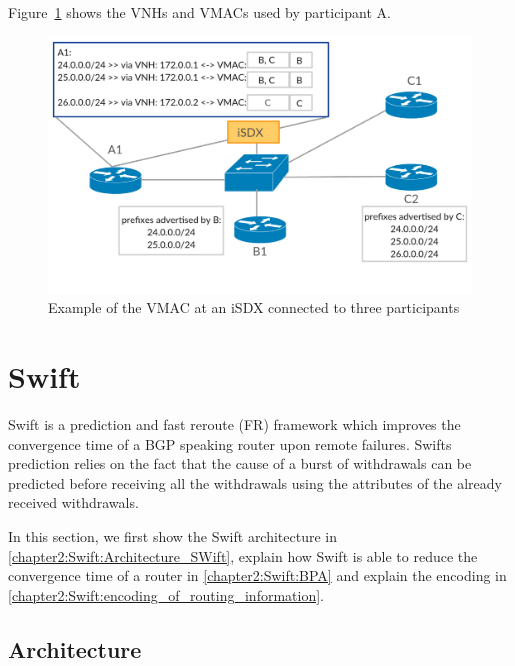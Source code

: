 Figure~\ref{fig:isdx_vmac} shows the VNHs and VMACs used by participant A.

\begin{figure}[h]
\center
\includegraphics[scale = 0.33]{Figures/sdx_vmac3.pdf}
\caption{Example of the VMAC at an iSDX connected to three participants}
\label{fig:isdx_vmac}
\end{figure}

\newpage

\section{\label{chapter2:Swift}Swift}

Swift is a prediction and fast reroute (FR) framework which improves the convergence time of a BGP speaking router upon remote failures. Swifts prediction relies on the fact that the cause of a burst of withdrawals can be predicted before receiving all the withdrawals using the attributes of the already received withdrawals.

In this section, we first show the Swift architecture in \ref{chapter2:Swift:Architecture_SWift}, explain how Swift is able to reduce the convergence time of a router in \ref{chapter2:Swift:BPA} and explain the encoding in \ref{chapter2:Swift:encoding_of_routing_information}.

\subsection{\label{chapter2:Swift:Architecture_SWift}Architecture}

